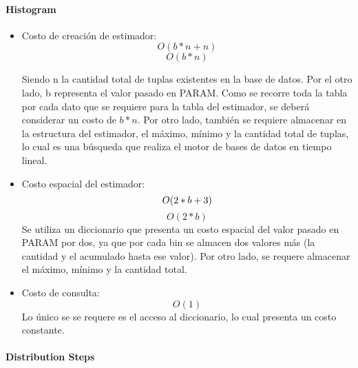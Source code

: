 \documentclass[10pt, a4paper,english,spanish,hidelinks]{article}
\begin{document}
\paragraph{Histogram}
\begin{itemize}

\item Costo de creación de estimador:
\begin{equation}
O(b * n + n )
\end{equation}
\begin{equation}
O(b * n)
\end{equation}

Siendo n la cantidad total de tuplas existentes en la base de datos. Por el otro lado, b representa el valor pasado en PARAM. Como se recorre toda la tabla por cada dato que se requiere para la tabla del estimador, se deberá considerar un costo de $b * n$. Por otro lado, también se requiere almacenar en la estructura del estimador, el máximo, mínimo y la cantidad total de tuplas, lo cual es una búsqueda que realiza el motor de bases de datos en tiempo lineal. 

\item Costo espacial del estimador: 
\begin{equation}
O(2 * b + 3 ) \\
\end{equation}
\begin{equation}
O(2 * b)
\end{equation}
Se utiliza un diccionario que presenta un costo espacial del valor pasado en PARAM por dos, ya que por cada bin se almacen dos valores más (la cantidad y el acumulado hasta ese valor). Por otro lado, se requere almacenar el máximo, mínimo y la cantidad total.

\item Costo de consulta: 
\begin{equation}
O(1)
\end{equation}
Lo único se se requere es el acceso al diccionario, lo cual presenta un costo constante. 

\end{itemize}
\paragraph{Distribution Steps}
\end{document}

